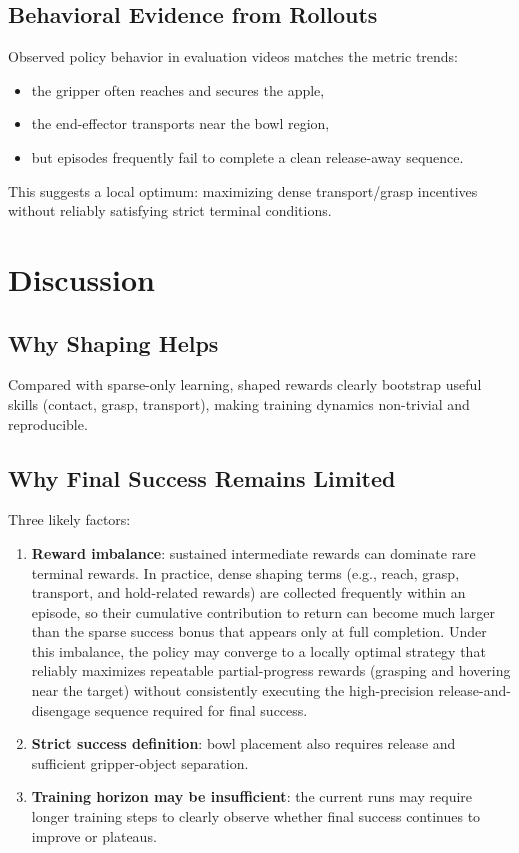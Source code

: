 \documentclass[11pt,a4paper]{article}
\begin{document}
\subsection{Behavioral Evidence from Rollouts}
Observed policy behavior in evaluation videos matches the metric trends:
\begin{itemize}
    \item the gripper often reaches and secures the apple,
    \item the end-effector transports near the bowl region,
    \item but episodes frequently fail to complete a clean release-away sequence.
\end{itemize}
This suggests a local optimum: maximizing dense transport/grasp incentives without reliably satisfying strict terminal conditions.

\section{Discussion}
\subsection{Why Shaping Helps}
Compared with sparse-only learning, shaped rewards clearly bootstrap useful skills (contact, grasp, transport), making training dynamics non-trivial and reproducible.

\subsection{Why Final Success Remains Limited}
Three likely factors:
\begin{enumerate}
    \item \textbf{Reward imbalance}: sustained intermediate rewards can dominate rare terminal rewards. In practice, dense shaping terms (e.g., reach, grasp, transport, and hold-related rewards) are collected frequently within an episode, so their cumulative contribution to return can become much larger than the sparse success bonus that appears only at full completion. Under this imbalance, the policy may converge to a locally optimal strategy that reliably maximizes repeatable partial-progress rewards (grasping and hovering near the target) without consistently executing the high-precision release-and-disengage sequence required for final success.
    \item \textbf{Strict success definition}: bowl placement also requires release and sufficient gripper-object separation.
    \item \textbf{Training horizon may be insufficient}: the current runs may require longer training steps to clearly observe whether final success continues to improve or plateaus.
\end{enumerate}
\end{document}
